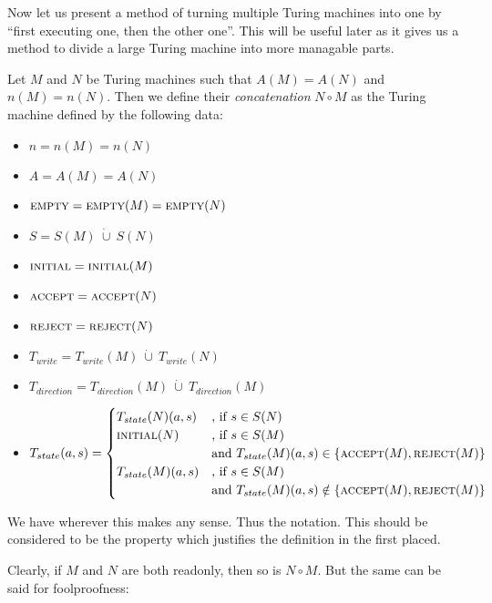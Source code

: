 Now let us present a method of turning multiple Turing machines into one by ``first executing one, then the other one''. This will be useful later as it gives us a method to divide a large Turing machine into more managable parts.

\begin{Definition}
	Let $M$ and $N$ be Turing machines such that $A(M) = A(N)$ and $n(M) = n(N)$. Then we define their \emph{concatenation} $N \circ M$ as the Turing machine defined by the following data:
	\begin{itemize}
		\item{$n = n(M) = n(N)$}
		\item{$A = A(M) = A(N)$}
		\item{$\text{\scshape{empty}} = \text{\scshape{empty}}(M) = \text{\scshape{empty}}(N)$}
		\item{$S = S(M)~\dot\cup~S(N)$}
		\item{$\text{\scshape{initial}} = \text{\scshape{initial}}(M)$}
		\item{$\text{\scshape{accept}} = \text{\scshape{accept}}(N)$}
		\item{$\text{\scshape{reject}} = \text{\scshape{reject}}(N)$}
		\item{$T_{write} = T_{write}(M)~\dot\cup~T_{write}(N)$}
		\item{$T_{direction} = T_{direction}(M)~\dot\cup~T_{direction}(M)$}
		\item{$T_{state} (a,s) =
			\begin{cases}
				T_{state}(N) (a,s) &\text{, if}~s \in S(N) \\
				\text{\scshape{initial}}(N) &\text{, if}~s \in S(M) \\&\text{and}~T_{state}(M)(a,s) \in \{\text{\scshape{accept}}(M),\text{\scshape{reject}}(M)\} \\
				T_{state}(M) (a,s) &\text{, if}~s \in S(M) \\&\text{and}~T_{state}(M)(a,s) \notin \{\text{\scshape{accept}}(M),\text{\scshape{reject}}(M)\}
			\end{cases}
		$}
	\end{itemize}
\end{Definition}
\remark We have  wherever this makes any sense. Thus the notation.
This should be considered to be the property which justifies the definition in the first placed.

Clearly, if $M$ and $N$ are both readonly, then so is $N \circ M$. But the same can be said for foolproofness:

